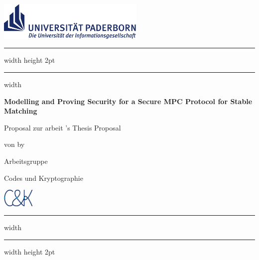 \thispagestyle{plain}

\includegraphics[width=7cm]{figures/upb_logo}

\bigskip

\hrule width \hsize height 2pt \kern 1mm \hrule width \hsize
\vspace*{6pt}

\begin{center}
	\Large\textbf{Modelling and Proving Security for a Secure MPC Protocol for Stable Matching}
\end{center}

\noindent
\begin{minipage}{6cm}
	\large{
		\ifgerman
			Proposal zur \Degree arbeit
		\else
			\Degree 's Thesis Proposal
		\fi
	}

	\ifgerman
		\large von
	\else
		\large by
	\fi
	\Author
\end{minipage}
\hfill
\begin{minipage}{6cm}
	\begin{minipage}{4.4cm}
		\flushright
		\normalsize Arbeitsgruppe

		Codes und Kryptographie
	\end{minipage}
	\begin{minipage}{1.5cm}
			\includegraphics[width=1.5cm]{figures/cuk_logo}
	\end{minipage}
\end{minipage}

\bigskip

\hrule width \hsize \kern 1mm \hrule width \hsize height 2pt
